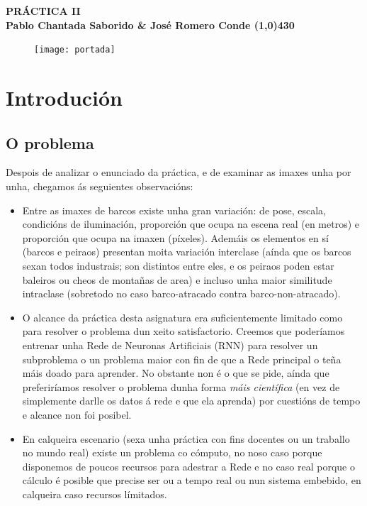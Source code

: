 \documentclass{article}
\begin{document}
	\begin{center}
		\LARGE\bfseries PRÁCTICA II\\
		\small Pablo Chantada Saborido \& José Romero Conde
		\line(1,0){430}
	\end{center}
	
\vspace*{380pt}
	
\begin{figure}[h]
	\centering
	\texttt{[image: portada]}
	\label{fig:portada}
\end{figure}
	
\thispagestyle{empty}
	
\newpage

\tableofcontents

\newpage
	
	
\section{Introdución}
\subsection{O problema}

Despois de analizar o enunciado da práctica, e de examinar as imaxes unha por unha, chegamos ás seguientes observacións:
\begin{itemize}
	\item Entre as imaxes de barcos existe unha gran variación: de pose, escala, condicións de iluminación, proporción que ocupa na escena real (en metros) e proporción que ocupa na imaxen (píxeles). Ademáis os elementos en sí (barcos e peiraos) presentan moita variación interclase (aínda que os barcos sexan todos industrais; son distintos entre eles, e os peiraos poden estar baleiros ou cheos de montañas de area) e incluso unha maior similitude intraclase (sobretodo no caso barco-atracado contra barco-non-atracado).
	\item O alcance da práctica desta asignatura era suficientemente limitado como para resolver o problema dun xeito satisfactorio. Creemos que poderíamos entrenar unha Rede de Neuronas Artificiais (RNN) para resolver un subproblema o un problema maior con fin de que a Rede principal o teña máis doado para aprender. No obstante non é o que se pide, aínda que preferiríamos resolver o problema dunha forma \emph{máis científica} (en vez de simplemente darlle os datos á rede e que ela aprenda) por cuestións de tempo e alcance non foi posibel.
	\item En calqueira escenario (sexa unha práctica con fins docentes ou un traballo no mundo real) existe un problema co cómputo, no noso caso porque disponemos de poucos recursos para adestrar a Rede e no caso real porque o cálculo é posible que precise ser ou a tempo real ou nun sistema embebido, en calqueira caso recursos límitados. 
\end{itemize}
\end{document}
